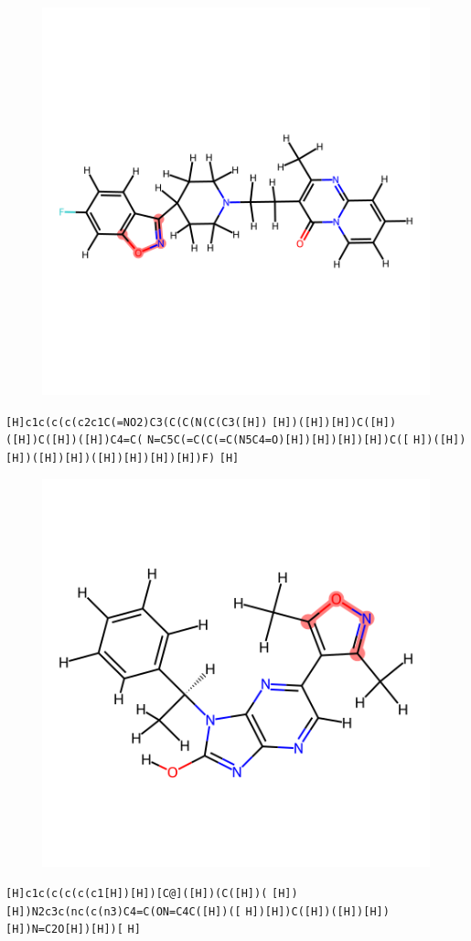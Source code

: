 \documentclass{article}
\begin{document}
\begin{figure}[ht]
\centering
    \includegraphics{mol30.png}
\end{figure}
\verb|[H]c1c(c(c(c2c1C(=NO2)C3(C(C(N(C(C3([H])| \verb|[H])([H])[H])C([H])([H])C([H])([H])C4=C(| \verb|N=C5C(=C(C(=C(N5C4=O)[H])[H])[H])[H])C([| \verb|H])([H])[H])([H])[H])([H])[H])[H])[H])F)| \verb|[H]|

\begin{figure}[ht]
\centering
    \includegraphics{mol31.png}
\end{figure}
\verb|[H]c1c(c(c(c(c1[H])[H])[C@]([H])(C([H])(| \verb|[H])[H])N2c3c(nc(c(n3)C4=C(ON=C4C([H])([| \verb|H])[H])C([H])([H])[H])[H])N=C2O[H])[H])[| \verb|H]|
\end{document}
